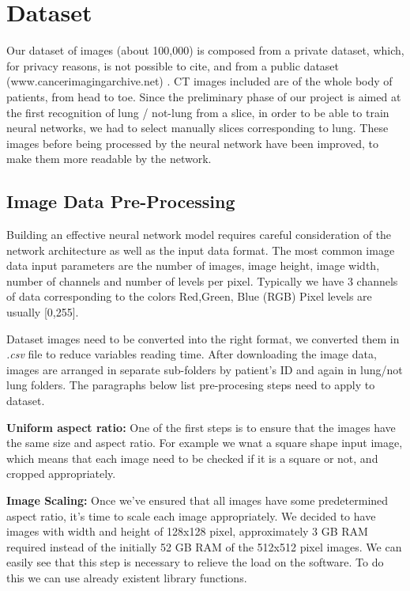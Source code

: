 \documentclass[../main.tex]{subfiles}
\begin{document}
\thispagestyle{empty}
\section{Dataset}

Our dataset of images (about 100,000) is composed from a private dataset, which, for privacy reasons, is not possible to cite, and from a public dataset (www.cancerimagingarchive.net) \cite{Clark2013,QIN,data}.
CT images included are of the whole body of patients, from head to toe. Since the preliminary phase of our project is aimed at the first recognition of lung / not-lung from a slice, in order to be able to train neural networks, we had to select manually slices corresponding to lung.
These images before being processed by the neural network have been improved, to make them more readable by the network.


\subsection{Image Data Pre-Processing}
Building an effective neural network model requires careful consideration of the network architecture as well as the input data format. The most common image data input parameters are the number of images, image height, image width, number of channels and number of levels per pixel. Typically we have 3 channels of data corresponding to the colors Red,Green, Blue (RGB) Pixel levels are usually [0,255].

Dataset images need to be converted into the right format, we converted them in \textit{.csv} file to reduce variables reading time. After downloading the image data, images are arranged in separate sub-folders by patient's ID and again in lung/not lung folders.
The paragraphs below list pre-procesing steps need to apply to dataset.

\textbf{Uniform aspect ratio:} One of the first steps is to ensure that the images have the same size and aspect ratio. For example we wnat a square shape input image, which means that each image need to be checked if it is a square or not, and cropped appropriately. 

\textbf{Image Scaling:} Once we’ve ensured that all images have some predetermined aspect ratio, it’s time to scale each image appropriately. We decided to have images with width and height of 128x128 pixel, approximately 3 GB RAM required instead of the initially 52 GB RAM of the 512x512 pixel images. We can easily see that this step is necessary to relieve the load on the software. To do this we can use already existent library functions.
\end{document}
